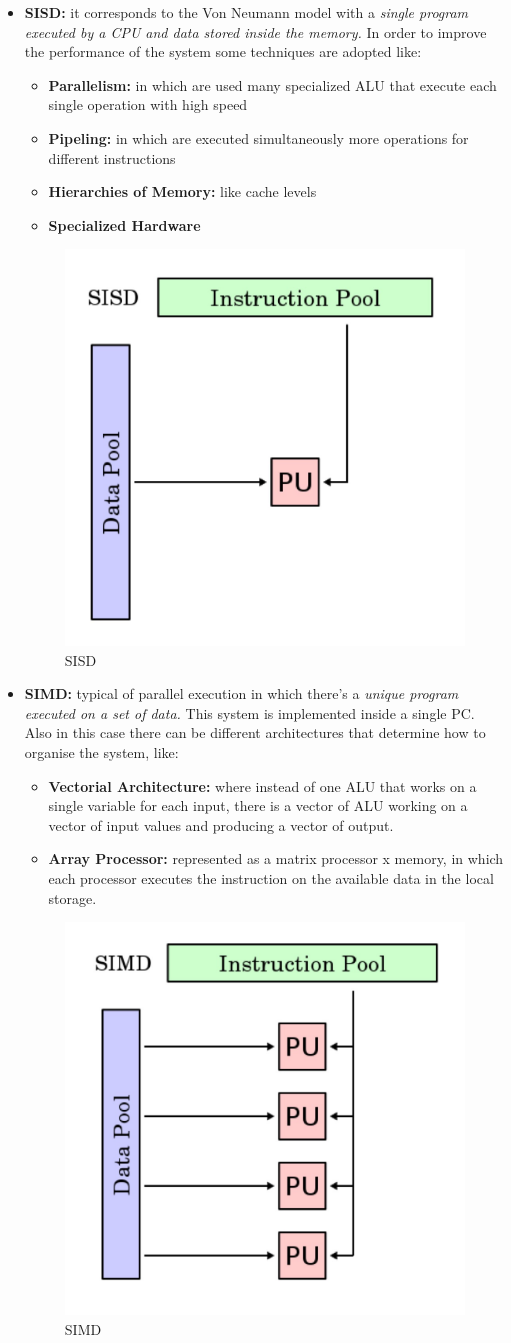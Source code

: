 \begin{itemize}
    \item \textbf{SISD:} it corresponds to the Von Neumann model with a \textit{single program executed by a CPU and data stored inside the memory.} In order to improve the performance of the system some techniques are adopted like:
        \begin{itemize}
            \item \textbf{Parallelism:} in which are used many specialized ALU that execute each single operation with high speed
            \item \textbf{Pipeling:} in which are executed simultaneously more operations for different instructions
            \item \textbf{Hierarchies of Memory:} like cache levels
            \item \textbf{Specialized Hardware}
        \end{itemize}
    \begin{figure}[!h]
                \centering
                \includegraphics[width=.30\linewidth]{images/distributedSystem/SISD.jpeg}
                \caption{SISD}
            \end{figure}
    \item \textbf{SIMD:} typical of parallel execution in which there’s a \textit{unique program executed on a set of data.} This system is implemented inside a single PC.  Also in this case there can be different architectures that determine how to organise the system, like: 
    \begin{itemize}
        \item \textbf{Vectorial Architecture:} where instead of one ALU that works on a single variable for each input, there is a vector of ALU working on a vector of input values and producing a vector of output.
        \item \textbf{Array Processor:} represented as a matrix processor x memory, in which each processor executes the instruction on the available data in the local storage.
    \end{itemize}
     \begin{figure}[!h]
            \centering
            \includegraphics[width=.30\linewidth]{images/distributedSystem/SIMD.jpeg}
            \caption{SIMD}
        \end{figure}
   

\end{itemize}
